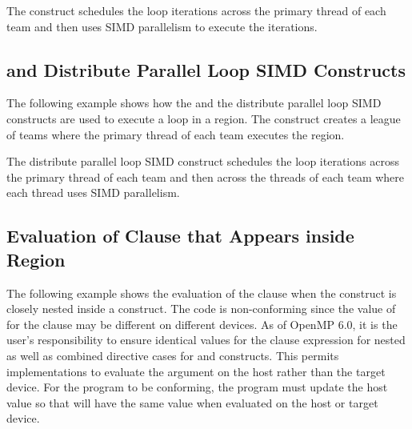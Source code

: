 The  construct schedules the loop iterations across 
the primary thread of each team and then uses SIMD parallelism to execute the iterations.



\subsection{ and Distribute Parallel Loop SIMD Constructs}
\label{subsec:teams_distribute_parallel_simd}

The following example shows how the  and the distribute 
parallel loop SIMD constructs are used to execute a loop in a  
region. The  construct creates a league of teams 
where the primary thread of each team executes the  region.

The distribute parallel loop SIMD construct schedules the loop iterations across 
the primary thread of each team and then across the threads of each team where each 
thread uses SIMD parallelism.



\subsection{Evaluation of  Clause that Appears inside  Region}
\label{subsec:target_teams_num_teams}

The following example shows the evaluation of the  clause when the  construct is closely nested inside a  construct. The code is non-conforming since the value of  for the clause may be different on different devices. As of OpenMP 6.0, it is the user's responsibility to ensure identical values for the clause expression for nested as well as combined directive cases for  and  constructs. This permits implementations to evaluate the  argument on the host rather than the target device. For the program to be conforming, the program must update the host value so that  will have the same value when evaluated on the host or target device.




